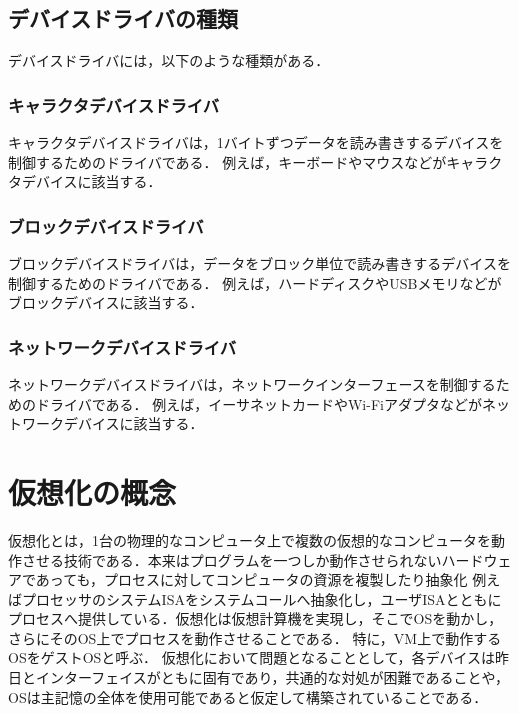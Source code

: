\documentclass[a4paper,11pt]{ltjsarticle}
\begin{document}
\subsection{デバイスドライバの種類}
デバイスドライバには，以下のような種類がある．
\subsubsection{キャラクタデバイスドライバ}
キャラクタデバイスドライバは，1バイトずつデータを読み書きするデバイスを制御するためのドライバである．
例えば，キーボードやマウスなどがキャラクタデバイスに該当する．
\subsubsection{ブロックデバイスドライバ}
ブロックデバイスドライバは，データをブロック単位で読み書きするデバイスを制御するためのドライバである．
例えば，ハードディスクやUSBメモリなどがブロックデバイスに該当する．
\subsubsection{ネットワークデバイスドライバ}
ネットワークデバイスドライバは，ネットワークインターフェースを制御するためのドライバである．
例えば，イーサネットカードやWi-Fiアダプタなどがネットワークデバイスに該当する．
\section{仮想化の概念}
仮想化とは，1台の物理的なコンピュータ上で複数の仮想的なコンピュータを動作させる技術である．本来はプログラムを一つしか動作させられないハードウェアであっても，プロセスに対してコンピュータの資源を複製したり抽象化
例えばプロセッサのシステムISAをシステムコールへ抽象化し，ユーザISAとともにプロセスへ提供している．仮想化は仮想計算機を実現し，そこでOSを動かし，さらにそのOS上でプロセスを動作させることである．
特に，VM上で動作するOSをゲストOSと呼ぶ．
仮想化において問題となることとして，各デバイスは昨日とインターフェイスがともに固有であり，共通的な対処が困難であることや，OSは主記憶の全体を使用可能であると仮定して構築されていることである．
\end{document}
